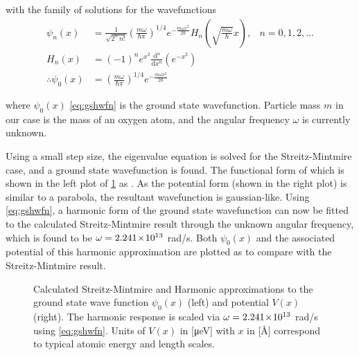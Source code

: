 with the family of solutions for the wavefunctions
\begin{align}\psi_n(x) &= \frac{1}{\sqrt{2^n\,n!}}\left(\frac{m\omega}{\hbar\pi}\right)^{1/4}e^{
- \frac{m\omega x^2}{2 \hbar}} H_n\left(\sqrt{\frac{m\omega}{\hbar}} x \right), &n = 0,1,2,\ldots \\
H_n(x) &= (-1)^n e^{x^2}\frac{\mathrm{d}^n}{\mathrm{d}x^n}\left(e^{-x^2}\right) \\
\therefore \psi_0(x) &= \left(\frac{m\omega}{\hbar\pi}\right)^{1/4}e^{
- \frac{m\omega x^2}{2 \hbar}} \label{eq:gshwfn}
\end{align}

where $\psi_0(x)$ \cref{eq:gshwfn} is the ground state wavefunction. Particle mass $m$ in our case is the mass of an oxygen atom, and the angular frequency $\omega$ is currently unknown.

Using a small step size, the eigenvalue equation is solved for the Streitz-Mintmire case, and a ground state wavefunction is found.
The functional form of which is shown in the left plot of \cref{fig:smvh} as .
As the potential form (shown in the right plot) is similar to a parabola, the resultant wavefunction is gaussian-like.
Using \cref{eq:gshwfn}, a harmonic form of the ground state wavefunction can now be fitted to the calculated Streitz-Mintmire result through the unknown angular frequency, which is found to be $\omega = 2.241\!\times\!10^{13}$ rad/s.
Both $\psi_0(x)$ and the associated potential of this harmonic approximation are plotted as  to compare with the Streitz-Mintmire result.
\begin{figure}[htp]
\smvhmargins
\begin{adjustwidth}{\smvhleft}{\smvhright}
\resizebox{\widefigure}{!}{}
\caption[Harmonic Approximation to Strietz Mintmire]{\label{fig:smvh}Calculated Streitz-Mintmire  and Harmonic approximations  to the ground state wave function $\psi_0(x)$ (left) and potential $V(x)$ (right). The harmonic response is scaled via $\omega = 2.241\!\times\!10^{13}$ rad/s using \cref{eq:gshwfn}. Units of $V(x)$ in [μeV] with $x$ in [Å] correspond to typical atomic energy and length scales.}
\end{adjustwidth}
\end{figure}

